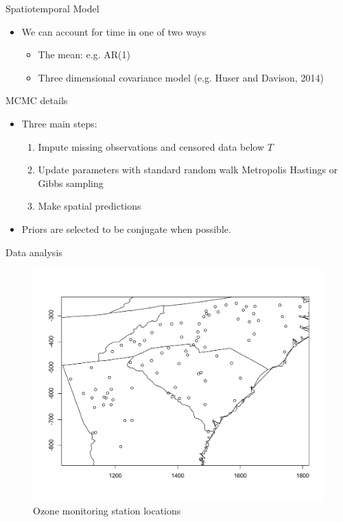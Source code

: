 \documentclass{beamer}
\begin{document}
\begin{frame}{Spatiotemporal Model}
  \begin{itemize} \setlength{\itemsep}{0.5em}
    \item We can account for time in one of two ways
    \begin{itemize}
    	\item The mean: e.g. AR(1)
	\item Three dimensional covariance model (e.g. Huser and Davison, 2014) 
    \end{itemize}
  \end{itemize}
\end{frame}

\begin{frame}{MCMC details}
  \begin{itemize} \setlength{\itemsep}{0.5em}
    \item Three main steps:
    \begin{enumerate}[1.]
      \item Impute missing observations and censored data below $T$
      \item Update parameters with standard random walk Metropolis Hastings or Gibbs sampling
      \item Make spatial predictions
    \end{enumerate}
    \item Priors are selected to be conjugate when possible.
  \end{itemize}
\end{frame}

\begin{frame}{Data analysis}
	\centering
	\begin{figure}
    \includegraphics[width=0.8\linewidth]{./plots/ozone_station.pdf}
    \caption{Ozone monitoring station locations}
    \end{figure}

\end{frame}
\end{document}
